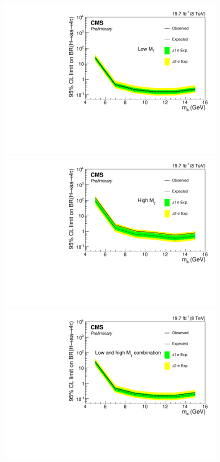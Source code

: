 \begin{figure}[hbtp]
  \begin{center}
    \includegraphics[width=\cmsFigWidth]{figures/expLimits_Br_lowMT_20GeV_ggHVBF}
    \includegraphics[width=\cmsFigWidth]{figures/expLimits_Br_highMT_20GeV_ggHWH}
    \includegraphics[width=\cmsFigWidth]{figures/expLimits_Br_20GeV_4sig}

\end{center}
\end{figure}
